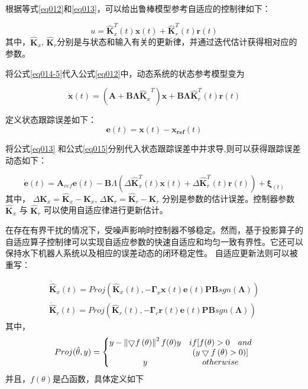 根据等式\ref{eq012}和\ref {eq013}，可以给出鲁棒模型参考自适应的控制律如下：

\begin{equation}
\label{eq014-5}
u = \hat{\bm{K}}_x ^{T}(t)\bm{x}(t) + \hat{\bm{K}}_r ^{T}(t)\bm{r}(t)
\end{equation}
其中，$\hat{\bm{K}}_x$, $\hat{\bm{K}}_r$分别是与状态和输入有关的更新律，并通过迭代估计获得相对应的参数。

将公式\ref{eq014-5}代入公式\ref{eq012}中，动态系统的状态参考模型变为

\begin{equation}
\label{eq015}
\bm{\dot x}(t)=(\bm{A}+\bm{B}\bm{\Lambda}{\hat{\bm{K}}_x}^T)\bm{x}
+ \bm{B} \bm{\Lambda}\hat{\bm{K}}_r ^{T}(t)\bm{r}(t)
\end{equation}

定义状态跟踪误差如下：
\begin{equation}
\bm{e}(t) = \bm{x}(t) - \bm{x_{ref}}(t)
\end{equation}

将公式\ref{eq013} 和公式\ref{eq015}分别代入状态跟踪误差中并求导,则可以获得跟踪误差动态如下：

\begin{equation}
\label{eq016}
\dot{\bm{e}}(t) = \bm{A}_{ref}\bm{e}(t)-\bm{B}\Lambda (\Delta \hat{\bm{K}}_x ^{T}(t) \bm{x}(t) + \Delta \hat{\bm{K}}_r ^{T}(t)\bm{r}(t)) + \bm{\xi}_(t)
\end{equation}
其中， $\Delta {\bm{K}}_x = \hat{\bm{K}}_x - {\bm{K}}_x$,  $\Delta {\bm{K}}_r = \hat{\bm{K}}_r - {\bm{K}}_r$ 分别是参数的估计误差。控制器参数 $\hat{\bm{K}}_x$ 与 $\hat{\bm{K}}_r$ 可以使用自适应律进行更新估计。

在存在有界干扰的情况下，受噪声影响时控制器不够稳定。然而，基于投影算子的自适应算子控制律可以实现自适应参数的快速自适应和均匀一致有界性。它还可以保持水下机器人系统以及相应的误差动态的闭环稳定性。 自适应更新法则可以被重写：

\begin{equation}
\label{eq017}
\begin{array}{l}
{\dot{\hat{\bm K}}_x (t)}=Proj(\hat{\bm K}_x(t),-\bm{\Gamma}_x \bm{x}(t) {\bm e}(t)\bm{PB}sgn(\bm \Lambda)) \\
{\dot{\hat{\bm K}}_r (t)}=Proj(\hat{\bm K}_r(t),-\bm{\Gamma}_r \bm{r}(t) {\bm e}(t)\bm{PB}sgn(\bm \Lambda))
\end{array}
\end{equation}
其中，
\begin{equation}
\label{eq018}
Proj(\hat \theta, y) = \left\{\begin{matrix}
y- \left \|   \bigtriangledown f\left ( \theta \right ) \right \| ^2 f(\theta) y & if [f( \theta) > 0   \quad and  \\
  &  (y\bigtriangledown f\left ( \theta \right ) >0 )]\\
y & otherwise \\
\end{matrix}\right.\\
\end{equation}
并且，$f(\theta)$是凸函数，具体定义如下

